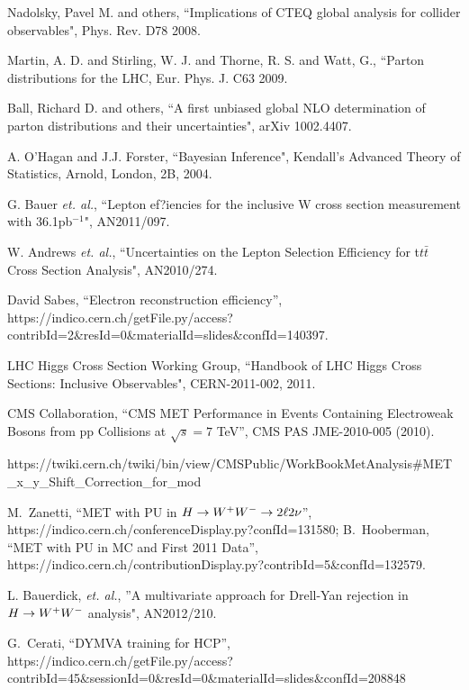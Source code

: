 Nadolsky, Pavel M. and others, ``Implications of CTEQ global analysis for 
collider observables", Phys. Rev. D78 2008.

Martin, A. D. and Stirling, W. J. and Thorne, R. S. and Watt, G., ``Parton 
distributions for the LHC, Eur. Phys. J. C63 2009.

Ball, Richard D. and others, ``A first unbiased global NLO determination 
of parton distributions and their uncertainties", arXiv 1002.4407.

A. O'Hagan and J.J. Forster, ``Bayesian Inference", Kendall's Advanced Theory of Statistics, 
Arnold, London, 2B, 2004.

G. Bauer {\it et. al.}, ``Lepton ef?iencies for the inclusive W cross section measurement with 36.1pb$^{-1}$", AN2011/097.

W. Andrews {\it et. al.}, ``Uncertainties on the Lepton Selection Efficiency for t$t\bar{t}$ Cross Section Analysis", AN2010/274.

David Sabes, ``Electron reconstruction efficiency'', \\
{\small https://indico.cern.ch/getFile.py/access?contribId=2\&resId=0\&materialId=slides\&confId=140397}.

LHC Higgs Cross Section Working Group, ``Handbook of LHC Higgs Cross Sections: 
Inclusive Observables", CERN-2011-002, 2011.

CMS Collaboration, ``CMS MET Performance in Events Containing Electroweak Bosons from pp Collisions at $\sqrt{s}=7$ TeV'', CMS PAS JME-2010-005 (2010).

{\small https://twiki.cern.ch/twiki/bin/view/CMSPublic/WorkBookMetAnalysis\#MET\_x\_y\_Shift\_Correction\_for\_mod}

M.~Zanetti, ``MET with PU in $H\to W^+W^- \to 2\ell 2\nu$'', \\
https://indico.cern.ch/conferenceDisplay.py?confId=131580; 
B.~Hooberman, ``MET with PU in MC and First 2011 Data'', https://indico.cern.ch/contributionDisplay.py?contribId=5\&confId=132579. 

L. Bauerdick, {\it et. al.}, ''A multivariate approach for Drell-Yan rejection in $H\to W^+W^-$ analysis", AN2012/210.

G.~Cerati, ``DYMVA training for HCP'', \\{\small https://indico.cern.ch/getFile.py/access?contribId=45\&sessionId=0\&resId=0\&materialId=slides\&confId=208848}

